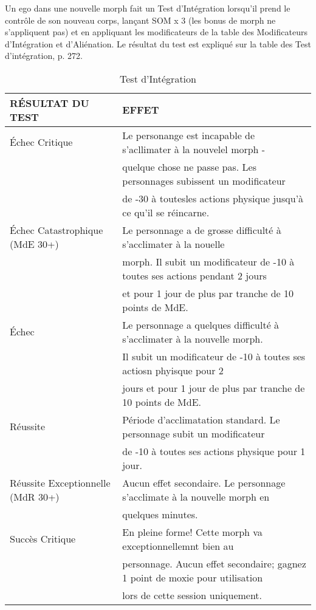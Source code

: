 Un ego dans une nouvelle morph fait un Test d'Intégration lorsqu'il prend le contrôle de son nouveau corps, lançant SOM x 3 (les bonus de morph ne s'appliquent pas) et en appliquant les modificateurs de la table des Modificateurs d'Intégration et d'Aliénation. Le résultat du test est expliqué sur la table des Test d'intégration, p. 272. 

\begin{table} \caption{Test d'Intégration} \begin{tabular}{|l|l|} 



\hline

RÉSULTAT DU TEST &EFFET\\ \hline

Échec Critique &Le personange est incapable de s'acllimater à la nouvelel morph - \\ &quelque chose ne passe pas. Les personnages subissent un modificateur\\ &de -30 à toutesles actions physique jusqu'à ce qu'il se réincarne. \\ \hline

Échec Catastrophique (MdE 30+) &Le personnage a de grosse difficulté à s'acclimater à la nouelle\\ &morph. Il subit un modificateur de -10 à toutes ses actions pendant 2 jours\\ &et pour 1 jour de plus par tranche de 10 points de MdE. \\ \hline

Échec &Le personnage a quelques difficulté à s'acclimater à la nouvelle morph. \\ &Il subit un modificateur de -10 à toutes ses actiosn phyisque pour 2\\ &jours et pour 1 jour de plus par tranche de 10 points de MdE. \\ \hline

Réussite &Période d'acclimatation standard. Le personnage subit un modificateur\\ &de -10 à toutes ses actions physique pour 1 jour. \\ \hline

Réussite Exceptionnelle (MdR 30+) &Aucun effet secondaire. Le personnage s'acclimate à la nouvelle morph en \\ &quelques minutes. \\ \hline

Succès Critique &En pleine forme! Cette morph va exceptionnellemnt bien au\\ &personnage. Aucun effet secondaire; gagnez 1 point de moxie pour utilisation\\ &lors de cette session uniquement. \\ \hline

\end{tabular} \end{table} 

